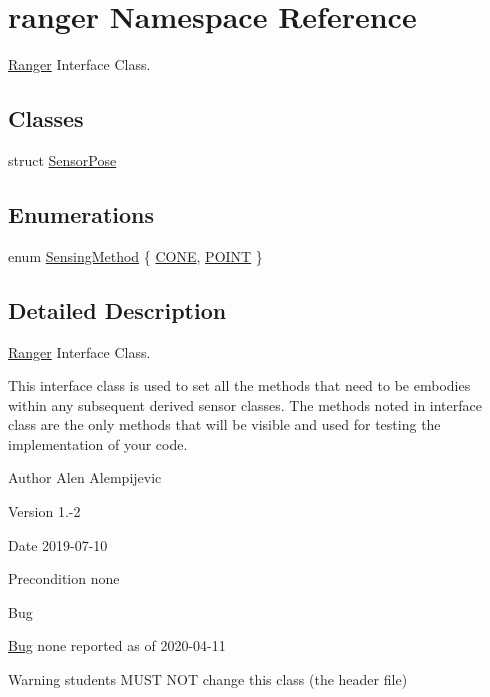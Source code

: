\hypertarget{namespaceranger}{}\section{ranger Namespace Reference}
\label{namespaceranger}


\hyperlink{classRanger}{Ranger} Interface Class.  


\subsection*{Classes}
\begin{DoxyCompactItemize}
\item 
struct \hyperlink{structranger_1_1SensorPose}{Sensor\+Pose}
\end{DoxyCompactItemize}
\subsection*{Enumerations}
\begin{DoxyCompactItemize}
\item 
enum \hyperlink{namespaceranger_ab04465c229cc50595ffe40a891a3b135}{Sensing\+Method} \{ \hyperlink{namespaceranger_ab04465c229cc50595ffe40a891a3b135ace9fd8ac6cdd5af7d1ef291eb9fc41af}{C\+O\+NE}, 
\hyperlink{namespaceranger_ab04465c229cc50595ffe40a891a3b135a6cd3b981ee1a6dc6afc81a8052d366f3}{P\+O\+I\+NT}
 \}
\end{DoxyCompactItemize}


\subsection{Detailed Description}
\hyperlink{classRanger}{Ranger} Interface Class. 

This interface class is used to set all the methods that need to be embodies within any subsequent derived sensor classes. The methods noted in interface class are the only methods that will be visible and used for testing the implementation of your code. \begin{DoxyAuthor}{Author}
Alen Alempijevic 
\end{DoxyAuthor}
\begin{DoxyVersion}{Version}
1.-\/2 
\end{DoxyVersion}
\begin{DoxyDate}{Date}
2019-\/07-\/10 
\end{DoxyDate}
\begin{DoxyPrecond}{Precondition}
none 
\end{DoxyPrecond}
\begin{DoxyRefDesc}{Bug}
\item[\hyperlink{bug__bug000003}{Bug}]none reported as of 2020-\/04-\/11 \end{DoxyRefDesc}
\begin{DoxyWarning}{Warning}
students M\+U\+ST N\+OT change this class (the header file) 
\end{DoxyWarning}


